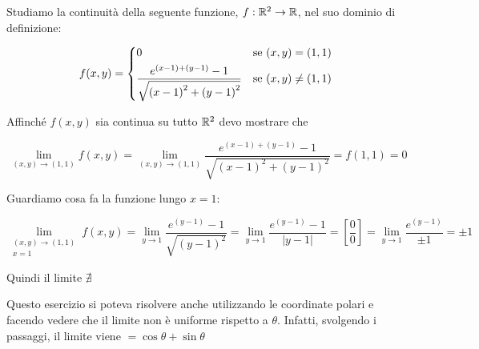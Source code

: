 Studiamo la continuità della seguente funzione, \(f: \mathbb{R}^2 \to \mathbb{R} \), nel suo dominio di definizione:

\[
    f(x,y) = \begin{cases*}
        0 & se \((x,y) = (1,1)\) \\
        \displaystyle{\frac{e^{(x-1)+(y-1)} -1}{\sqrt{{(x-1)}^2 + {(y-1)}^2}}} & se \((x,y) \ne (1,1)\)
    \end{cases*}
\]

Affinché \(f(x,y)\) sia continua su tutto \(\mathbb{R}^2\) devo mostrare che

\[
    \lim_{(x,y) \to (1,1)} f(x,y) = \lim_{(x,y) \to (1,1)} \frac{e^{(x-1)+(y-1)} -1}{\sqrt{{(x-1)}^2 + {(y-1)}^2}} = f(1,1) = 0
\]

Guardiamo cosa fa la funzione lungo \(x=1\):

\[
    \lim_{\begin{smallmatrix}(x,y) \to (1,1) \\ x=1\end{smallmatrix}} f(x,y) =
    \lim_{y \to 1} \frac{e^{(y-1)} -1}{\sqrt{{(y-1)}^2}} =
    \lim_{y \to 1} \frac{e^{(y-1)} -1}{|y-1|} =
    \left[\frac{0}{0}\right] =
    \lim_{y \to 1} \frac{e^{(y-1)}}{\pm 1} = \pm 1
\]

Quindi il limite \(\nexists \)

Questo esercizio si poteva risolvere anche utilizzando le coordinate polari e facendo vedere che il limite non è uniforme rispetto a \(\theta \). Infatti, svolgendo i passaggi, il limite viene \(= \cos\theta + \sin\theta \)
